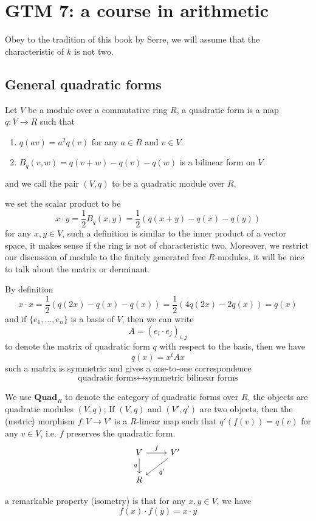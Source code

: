 \section{GTM 7: a course in arithmetic}

Obey to the tradition of this book by Serre, we will assume that the characteristic of \(k\) is not two.

\subsection{General quadratic forms}

\begin{definition}
    Let \(V\) be a module over a commutative ring \(R\), a quadratic form is a map \(q: V \to R\)  such that
    \begin{enumerate}
        \item \(q(av) = a^2q(v)\) for any \(a \in R\) and \(v \in V\).
        \item \(B_q(v,w) = q(v+w) - q(v) - q(w)\) is a bilinear form on \(V\).
    \end{enumerate}
    and we call the pair \((V,q)\) to be a quadratic module over \(R\).
\end{definition}

we set the scalar product to be 
\[x \cdot y = \frac{1}{2}B_q(x,y) = \frac{1}{2}(q(x+y) - q(x) - q(y))\]
for any \(x,y \in V\), such a definition is similar to the inner product of a vector space, it makes sense if the ring is not of characteristic two. Moreover, we restrict our discussion of module to the finitely generated free \(R\)-modules, it will be nice to talk about the matrix or derminant.


\begin{remark}
    By definition
    \[x \cdot x = \frac{1}{2}(q(2x)-q(x)-q(x)) = \frac{1}{2}(4q(2x)-2q(x)) = q(x)\]
    and if \(\{e_1,...,e_n\}\) is a basis of \(V\), then we can write 
    \[A = (e_i \cdot e_j)_{i,j}\]
    to denote the matrix of quadratic form \(q\) with respect to the basis, then we have
    \[q(x) = x^tAx\]
    such a matrix is symmetric and gives a one-to-one correspondence
    \[\text{quadratic forms} \longleftrightarrow \text{symmetric bilinear forms}\]
\end{remark}

\begin{remark}
    We use \(\mathbf{Quad}_R\) to denote the category of quadratic forms over \(R\), the objects are quadratic modules \((V,q)\); If \((V,q)\) and \((V',q')\) are two objects, then the (metric) morphism \(f:V \to V'\) is a \(R\)-linear map such that \(q'(f(v)) = q(v)\) for any \(v \in V\), i.e. \(f\) preserves the quadratic form.
\[\begin{tikzcd}
	V & {V'} \\
	R
	\arrow["f", from=1-1, to=1-2]
	\arrow["q"', from=1-1, to=2-1]
	\arrow["{q'}", from=1-2, to=2-1]
\end{tikzcd}\]

a remarkable property (isometry) is that for any \(x,y \in V\), we have
\[f(x) \cdot f(y) = x \cdot y\]
\end{remark}

